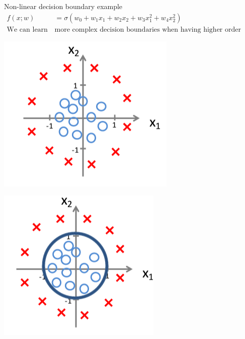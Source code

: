 \documentclass[serif, aspectratio=169]{beamer}
\begin{document}
\begin{frame}{Non-linear decision boundary example}
    \begin{align*}
        f(x;w) &= \sigma (w_0 + w_1 x_1 + w_2 x_2 + w_3x_1^2 + w_4x_2^2) \\
        \text{We can learn } & \text{more complex decision boundaries when having higher order terms}
    \end{align*}
    
    \begin{minipage}{0.30\linewidth}
        \centering
        \includegraphics[width=\linewidth]{pic/lrDB3.png}
    \end{minipage}
    \hfill
    \begin{minipage}{0.30\linewidth}
        \centering
        \includegraphics[width=\linewidth]{pic/lrDB4.png}
    \end{minipage}
    

\end{frame}
\end{document}
